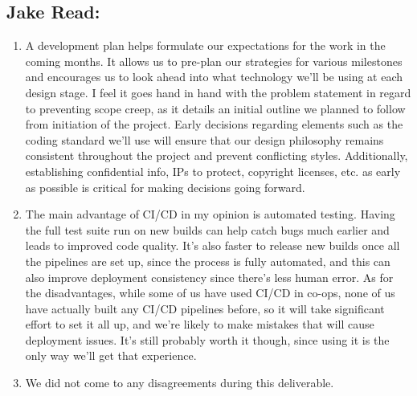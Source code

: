 \documentclass{article}
\begin{document}
\subsection*{Jake Read:}\label{subsec:jake-read-reflection}
\begin{enumerate}
    \item
        A development plan helps formulate our expectations for the work in the coming months.
        It allows us to pre-plan our strategies for various milestones and encourages us to look ahead into what technology we’ll be using at each design stage.
        I feel it goes hand in hand with the problem statement in regard to preventing scope creep, as it details an initial outline we planned to follow from initiation of the project.
        Early decisions regarding elements such as the coding standard we’ll use will ensure that our design philosophy remains consistent throughout the project and prevent conflicting styles.
        Additionally, establishing confidential info, IPs to protect, copyright licenses, etc. as early as possible is critical for making decisions going forward.

    \item
        The main advantage of CI/CD in my opinion is automated testing.
        Having the full test suite run on new builds can help catch bugs much earlier and leads to improved code quality.
        It’s also faster to release new builds once all the pipelines are set up, since the process is fully automated, and this can also improve deployment consistency since there’s less human error.
        As for the disadvantages, while some of us have used CI/CD in co-ops, none of us have actually built any CI/CD pipelines before, so it will take significant effort to set it all up, and we’re likely to make mistakes that will cause deployment issues.
        It’s still probably worth it though, since using it is the only way we’ll get that experience.

    \item
        We did not come to any disagreements during this deliverable.
\end{enumerate}
\end{document}
